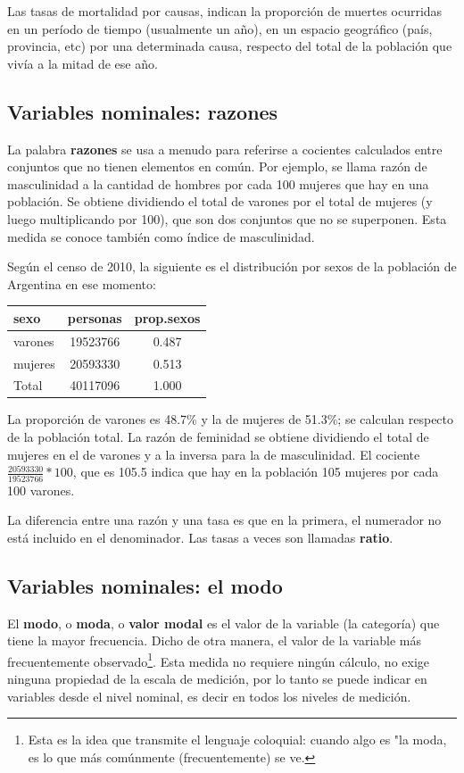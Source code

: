 \documentclass[]{book}
\let\rmarkdownfootnote\footnote%
\def\footnote{\protect\rmarkdownfootnote}
\begin{document}
Las tasas de mortalidad por causas, indican la proporción de muertes ocurridas en un período de tiempo (usualmente un año), en un espacio geográfico (país, provincia, etc) por una determinada causa, respecto del total de la población que vivía a la mitad de ese año.

\hypertarget{variables-nominales-razones}{%
\subsection{Variables nominales: razones}\label{variables-nominales-razones}}

La palabra \textbf{razones} se usa a menudo para referirse a cocientes
calculados entre conjuntos que no tienen elementos en común. Por
ejemplo, se llama razón de masculinidad a la cantidad de hombres por
cada 100 mujeres que hay en una población. Se obtiene dividiendo el
total de varones por el total de mujeres (y luego multiplicando por
100), que son dos conjuntos que no se superponen. Esta medida se conoce también como índice de masculinidad.

Según el censo de 2010, la siguiente es el distribución por sexos de la población de Argentina en ese momento:

\begin{longtable}[]{@{}lcc@{}}
\toprule
sexo & personas & prop.sexos\tabularnewline
\midrule
\endhead
varones & 19523766 & 0.487\tabularnewline
mujeres & 20593330 & 0.513\tabularnewline
Total & 40117096 & 1.000\tabularnewline
\bottomrule
\end{longtable}

La proporción de varones es 48.7\% y la de mujeres de 51.3\%; se calculan respecto de la población total. La razón de feminidad se obtiene dividiendo el total de mujeres en el de varones y a la inversa para la de masculinidad. El cociente \(\frac{20593330}{19523766}*100\), que es 105.5 indica que hay en la población 105 mujeres por cada 100 varones.

La diferencia entre una razón y una tasa es que en la primera, el numerador no está incluido en el denominador. Las tasas a veces son llamadas \textbf{ratio}.

\hypertarget{variables-nominales-el-modo}{%
\subsection{Variables nominales: el modo}\label{variables-nominales-el-modo}}

El \textbf{modo}, o \textbf{moda}, o \textbf{valor modal} es el valor de la variable
(la categoría) que tiene la mayor frecuencia. Dicho de otra manera, el valor de la variable más frecuentemente observado\footnote{Esta es la idea que transmite el lenguaje coloquial: cuando algo es "la moda, es lo que más comúnmente (frecuentemente) se ve.}. Esta medida no requiere ningún cálculo, no exige ninguna propiedad de la escala de
medición, por lo tanto se puede indicar en variables desde el nivel
nominal, es decir en todos los niveles de medición.
\end{document}
